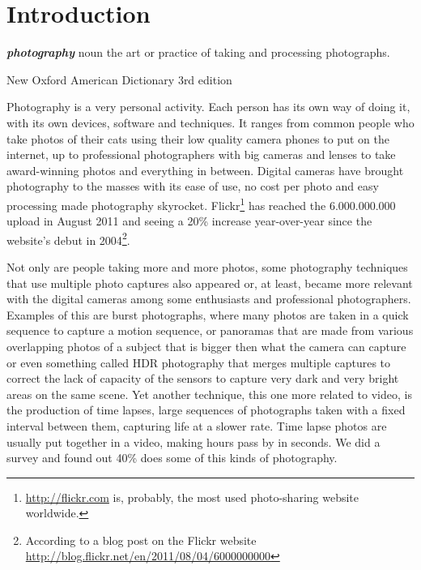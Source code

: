 \chapter{Introduction} %
\label{chapter:introduction}



\setlength{\epigraphwidth}{.5\textwidth}
\setlength{\afterepigraphskip}{\baselineskip}

\epigraph{\emph{\textbf{photography}}\newline
noun\newline
the art or practice of taking and processing photographs.}{\footnotesize New Oxford American Dictionary 3rd edition}

Photography is a very personal activity. Each person has its own way of doing it, with its own devices, software and techniques. It ranges from common people who take photos of their cats using their low quality camera phones to put on the internet, up to professional photographers with big cameras and lenses to take award-winning photos and everything in between. Digital cameras have brought photography to the masses with its ease of use, no cost per photo and easy processing made photography skyrocket. Flickr\footnote{\url{http://flickr.com} is, probably, the most used photo-sharing website worldwide.} has reached the 6.000.000.000 upload in August 2011 and seeing a 20\% increase year-over-year since the website's debut in 2004\footnote{According to a blog post on the Flickr website \url{http://blog.flickr.net/en/2011/08/04/6000000000}}.

Not only are people taking more and more photos, some photography techniques that use multiple photo captures also appeared or, at least, became more relevant with the digital cameras among some enthusiasts and professional photographers. Examples of this are burst photographs, where many photos are taken in a quick sequence to capture a motion sequence, or panoramas that are made from various overlapping photos of a subject that is bigger then what the camera can capture or even something called \acf{HDR} photography that merges multiple captures to correct the lack of capacity of the sensors to capture very dark and very bright areas on the same scene. Yet another technique, this one more related to video, is the production of time lapses, large sequences of photographs taken with a fixed interval between them, capturing life at a slower rate. Time lapse photos are usually put together in a video, making hours pass by in seconds. We did a survey and found out 40\% does some of this kinds of photography.

